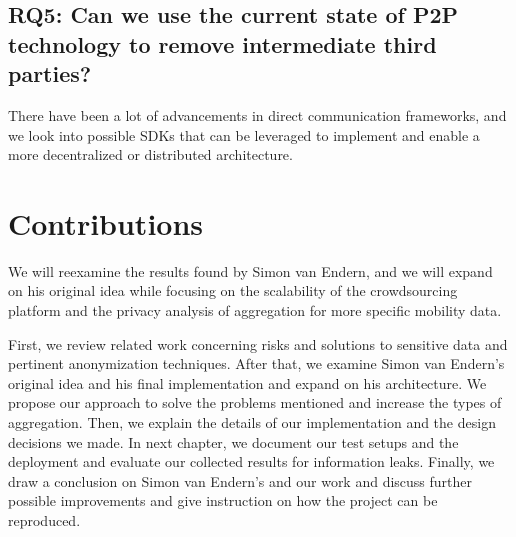 \subsection*{RQ5: Can we use the current state of P2P technology to remove intermediate third parties?}
There have been a lot of advancements in direct communication frameworks, and we look into possible SDKs that can be leveraged to implement and enable a more decentralized or distributed architecture.

\section{Contributions}

We will reexamine the results found by Simon van Endern, and we will expand on his original idea while focusing on the scalability of the crowdsourcing platform and the privacy analysis of aggregation for more specific mobility data.

First, we review related work concerning risks and solutions to sensitive data and pertinent anonymization techniques. After that, we examine Simon van Endern's original idea and his final implementation and expand on his architecture. We propose our approach to solve the  problems mentioned and increase the types of aggregation. Then, we explain the details of our implementation and the design decisions we made. In next chapter, we document our test setups and the deployment and evaluate our collected results for information leaks. Finally, we draw a conclusion on Simon van Endern's and our work and discuss further possible improvements and give instruction on how the project can be reproduced.
